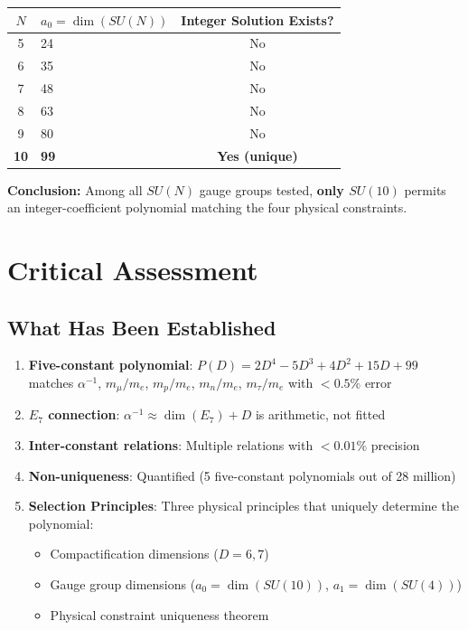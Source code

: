 \documentclass[11pt,a4paper]{article}
\begin{document}
\begin{center}
\begin{tabular}{clc}
\hline
$N$ & $a_0 = \dim(SU(N))$ & Integer Solution Exists? \\
\hline
5 & 24 & No \\
6 & 35 & No \\
7 & 48 & No \\
8 & 63 & No \\
9 & 80 & No \\
\textbf{10} & \textbf{99} & \textbf{Yes (unique)} \\
\hline
\end{tabular}
\end{center}

\textbf{Conclusion:} Among all $SU(N)$ gauge groups tested, \textbf{only $SU(10)$} permits an integer-coefficient polynomial matching the four physical constraints.

\section{Critical Assessment}

\subsection{What Has Been Established}

\begin{enumerate}
    \item \textbf{Five-constant polynomial}: $P(D) = 2D^4 - 5D^3 + 4D^2 + 15D + 99$ matches $\alpha^{-1}$, $m_\mu/m_e$, $m_p/m_e$, $m_n/m_e$, $m_\tau/m_e$ with $< 0.5\%$ error
    \item \textbf{$E_7$ connection}: $\alpha^{-1} \approx \dim(E_7) + D$ is arithmetic, not fitted
    \item \textbf{Inter-constant relations}: Multiple relations with $< 0.01\%$ precision
    \item \textbf{Non-uniqueness}: Quantified (5 five-constant polynomials out of 28 million)
    \item \textbf{Selection Principles}: Three physical principles that uniquely determine the polynomial:
    \begin{itemize}
        \item Compactification dimensions ($D = 6, 7$)
        \item Gauge group dimensions ($a_0 = \dim(SU(10))$, $a_1 = \dim(SU(4))$)
        \item Physical constraint uniqueness theorem
    \end{itemize}
\end{enumerate}
\end{document}
